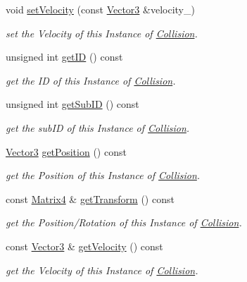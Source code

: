 \begin{DoxyCompactItemize}
void \hyperlink{class_i_dream_sky_1_1_collision_aee897f30094e0aceba97002de014057e}{set\+Velocity} (const \hyperlink{class_i_dream_sky_1_1_vector3}{Vector3} \&velocity\+\_\+)
\begin{DoxyCompactList}\small\item\em set the Velocity of this Instance of \hyperlink{class_i_dream_sky_1_1_collision}{Collision}. \end{DoxyCompactList}\item 
unsigned int \hyperlink{class_i_dream_sky_1_1_collision_a8b48c9d3da28892730e5ead328989f6b}{get\+ID} () const 
\begin{DoxyCompactList}\small\item\em get the ID of this Instance of \hyperlink{class_i_dream_sky_1_1_collision}{Collision}. \end{DoxyCompactList}\item 
unsigned int \hyperlink{class_i_dream_sky_1_1_collision_a7975bf1fe6ed60afbf3e4faa50561096}{get\+Sub\+ID} () const 
\begin{DoxyCompactList}\small\item\em get the sub\+ID of this Instance of \hyperlink{class_i_dream_sky_1_1_collision}{Collision}. \end{DoxyCompactList}\item 
\hyperlink{class_i_dream_sky_1_1_vector3}{Vector3} \hyperlink{class_i_dream_sky_1_1_collision_a759c9902ad30a31dca7e3ba0ad9e4f01}{get\+Position} () const 
\begin{DoxyCompactList}\small\item\em get the Position of this Instance of \hyperlink{class_i_dream_sky_1_1_collision}{Collision}. \end{DoxyCompactList}\item 
const \hyperlink{class_i_dream_sky_1_1_matrix4}{Matrix4} \& \hyperlink{class_i_dream_sky_1_1_collision_aed5c534471618d2057cafb33fe0f9a9d}{get\+Transform} () const 
\begin{DoxyCompactList}\small\item\em get the Position/\+Rotation of this Instance of \hyperlink{class_i_dream_sky_1_1_collision}{Collision}. \end{DoxyCompactList}\item 
const \hyperlink{class_i_dream_sky_1_1_vector3}{Vector3} \& \hyperlink{class_i_dream_sky_1_1_collision_ab1987f6bf0de0317b0ba6eff42360105}{get\+Velocity} () const 
\begin{DoxyCompactList}\small\item\em get the Velocity of this Instance of \hyperlink{class_i_dream_sky_1_1_collision}{Collision}. \end{DoxyCompactList}\item 

\end{DoxyCompactItemize}
